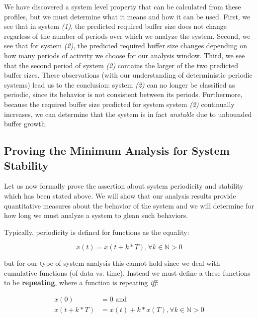 We have discovered a system level property that can be calculated from
these profiles, but we must determine what it means and how it can be
used.  First, we see that in system \emph{(1)}, the predicted required
buffer size does not change regarless of the number of periods over
which we analyze the system.  Second, we see that for system \emph{(2)},
the predicted required buffer size changes depending on how many
periods of activity we choose for our analysis window.  Third, we see
that the second period of system \emph{(2)} contains the larger of the two
predicted buffer sizes.  These observations (with our understanding of
deterministic periodic systems) lead us to the conclusion: system
\emph{(2)} can no longer be classified as periodic, since its behavior is
not consistent between its periods.  Furthermore, because the required
buffer size predicted for system system \emph{(2)} continually increases,
we can determine that the system is in fact \emph{unstable} due to
unbounded buffer growth.

\subsection{Proving the Minimum Analysis for System Stability}
\label{subsec:periodic_proof}

Let us now formally prove the assertion about system periodicity and
stability which has been stated above.  We will show that our analysis
results provide quantitative measures about the behavior of the system
and we will determine for how long we must analyze a system to glean
such behaviors.

Typically, periodicity is defined for functions as the equality:

\begin{equation}
  x(t) = x(t + k * T), \forall k \in \mathbb{N} > 0
\end{equation}

but for our type of system analysis this cannot hold since we deal
with cumulative functions (of data vs. time).  Instead we must define
a these functions to be \textbf{repeating}, where a function is repeating
\emph{iff}:

\begin{equation}
  \begin{split}
    x(0) &= 0 \text{  and}\\
    x(t + k * T) &= x(t) + k * x(T), \forall k \in \mathbb{N} > 0
  \end{split}
\end{equation}


